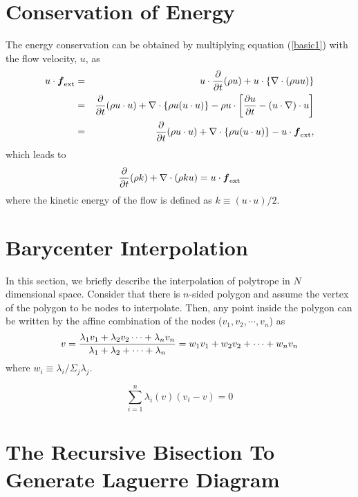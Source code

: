 \documentclass[twocolumn]{aastex63}
\newcommand{\vel}{{u}}
\begin{document}
\section{Conservation of Energy}
The energy conservation can be obtained by multiplying equation (\ref{basic1}) with the flow velocity, $\vel$, as 
\begin{eqnarray}
	 \vel\cdot\boldsymbol{f}_\text{ext} &=& \vel\cdot{\partial \over \partial t}(\rho\vel) + \vel\cdot\left\{\nabla\cdot(\rho\vel\vel)\right\} \\ \nonumber
	&=&  {\partial\over \partial t}(\rho \vel\cdot\vel) + \nabla\cdot\left\{\rho \vel (\vel\cdot\vel)\right\} - \rho\vel\cdot \left[
	{\partial\vel\over\partial t}-(\vel\cdot\nabla)\cdot\vel \right] \\
	&=& {\partial\over \partial t}(\rho \vel\cdot\vel) + \nabla\cdot\left\{\rho \vel (\vel\cdot\vel)\right\} -\vel\cdot\boldsymbol{f}_\text{ext},
\end{eqnarray}
which leads to
\begin{equation}
	{\partial \over \partial t}(\rho k) + \nabla\cdot(\rho k \vel) = \vel\cdot\boldsymbol{f}_\text{ext}
\end{equation}
where the kinetic energy of the flow is defined as $k \equiv (\vel\cdot\vel)/2$.


\section{Barycenter Interpolation} \label{baryinter}
In this section, we briefly describe the interpolation of polytrope in $N$ dimensional space.
Consider that there is $n$-sided polygon and assume the vertex of the polygon to be nodes to interpolate. Then, any point inside the polygon can be written by the affine combination of the nodes ($v_1, v_2, \cdots, v_n$) as
\begin{equation}
v = 	{\lambda_1 v_1 + \lambda_2 v_2\cdots +\lambda_n v_n \over \lambda_1 + \lambda_2 +\cdots + \lambda_n} = w_1v_1+w_2v_2+\cdots +w_nv_n
\end{equation} 
where $w_i \equiv \lambda_i/\Sigma_j \lambda_j$.

\begin{equation}
	\sum_{i=1}^n \lambda_i(v) (v_i-v) = 0
\end{equation}


\section{The Recursive Bisection To Generate Laguerre Diagram } \label{rbl}
\end{document}

